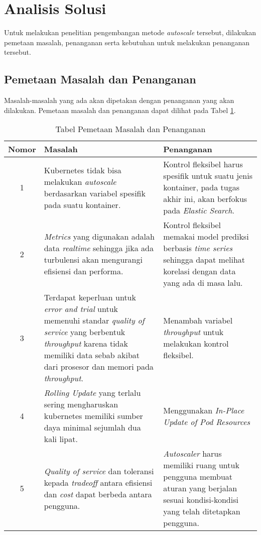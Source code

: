 \section{Analisis Solusi}

Untuk melakukan penelitian pengembangan metode \textit{autoscale} tersebut, dilakukan pemetaan masalah, penanganan serta kebutuhan untuk melakukan penanganan tersebut.

\subsection{Pemetaan Masalah dan Penanganan}
\label{sec:pemetaan-masalah}
Masalah-masalah yang ada akan dipetakan dengan penanganan yang akan dilakukan. Pemetaan masalah dan penanganan dapat dilihat pada Tabel \ref{tab:pemetaan-masalah}.

\begin{table}[h]
    \caption{Tabel Pemetaan Masalah dan Penanganan}
    \vspace{0.25cm}
    \begin{center}
        \begin{tabular}{|c|p{2.5in}|p{2.5in}|}
            \hline
            Nomor & Masalah & Penanganan \tabularnewline
            \hline
            1 &
            Kubernetes tidak bisa melakukan \textit{autoscale} berdasarkan variabel spesifik pada suatu kontainer. &
            Kontrol fleksibel harus spesifik untuk suatu jenis kontainer, pada tugas akhir ini, akan berfokus pada \textit{Elastic Search}. \tabularnewline
            2 &
            \textit{Metrics} yang digunakan adalah data \textit{realtime} sehingga jika ada turbulensi akan mengurangi efisiensi dan performa. &
            Kontrol fleksibel memakai model prediksi berbasis \textit{time series} sehingga dapat melihat korelasi dengan data yang ada di masa lalu.\tabularnewline
            3 & Terdapat keperluan untuk \textit{error and trial} untuk memenuhi standar \textit{quality of service} yang berbentuk \textit{throughput} karena tidak memiliki data sebab akibat dari prosesor dan memori pada \textit{throughput}. &
            Menambah variabel \textit{throughput} untuk melakukan kontrol fleksibel.
            \tabularnewline
            4 & \textit{Rolling Update} yang terlalu sering mengharuskan kubernetes memiliki sumber daya minimal sejumlah dua kali lipat. &
            Menggunakan \textit{In-Place Update of Pod Resources} \tabularnewline
            5 & \textit{Quality of service} dan toleransi kepada \textit{tradeoff} antara efisiensi dan \textit{cost} dapat berbeda antara pengguna. &
            \textit{Autoscaler} harus memiliki ruang untuk pengguna membuat aturan yang berjalan sesuai kondisi-kondisi yang telah ditetapkan pengguna.\tabularnewline
            \hline
        \end{tabular}
    \end{center}
    \label{tab:pemetaan-masalah}
\end{table}